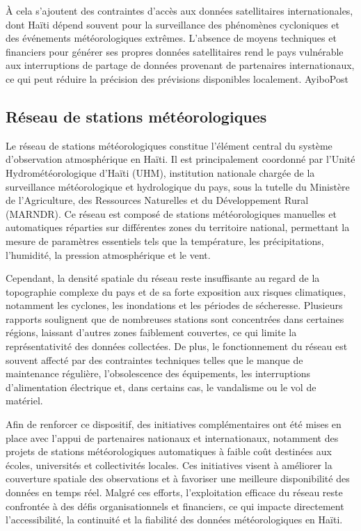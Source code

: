 À cela s’ajoutent des contraintes d’accès aux données satellitaires internationales, dont Haïti dépend souvent pour la surveillance des phénomènes cycloniques et des événements météorologiques extrêmes. L’absence de moyens techniques et financiers pour générer ses propres données satellitaires rend le pays vulnérable aux interruptions de partage de données provenant de partenaires internationaux, ce qui peut réduire la précision des prévisions disponibles localement. 
AyiboPost

\clearpage
\subsection{Réseau de stations météorologiques}
Le réseau de stations météorologiques constitue l’élément central du système d’observation atmosphérique en Haïti. Il est principalement coordonné par l’Unité Hydrométéorologique d’Haïti (UHM), institution nationale chargée de la surveillance météorologique et hydrologique du pays, sous la tutelle du Ministère de l’Agriculture, des Ressources Naturelles et du Développement Rural (MARNDR). Ce réseau est composé de stations météorologiques manuelles et automatiques réparties sur différentes zones du territoire national, permettant la mesure de paramètres essentiels tels que la température, les précipitations, l’humidité, la pression atmosphérique et le vent.

Cependant, la densité spatiale du réseau reste insuffisante au regard de la topographie complexe du pays et de sa forte exposition aux risques climatiques, notamment les cyclones, les inondations et les périodes de sécheresse. Plusieurs rapports soulignent que de nombreuses stations sont concentrées dans certaines régions, laissant d’autres zones faiblement couvertes, ce qui limite la représentativité des données collectées. De plus, le fonctionnement du réseau est souvent affecté par des contraintes techniques telles que le manque de maintenance régulière, l’obsolescence des équipements, les interruptions d’alimentation électrique et, dans certains cas, le vandalisme ou le vol de matériel.

Afin de renforcer ce dispositif, des initiatives complémentaires ont été mises en place avec l’appui de partenaires nationaux et internationaux, notamment des projets de stations météorologiques automatiques à faible coût destinées aux écoles, universités et collectivités locales. Ces initiatives visent à améliorer la couverture spatiale des observations et à favoriser une meilleure disponibilité des données en temps réel. Malgré ces efforts, l’exploitation efficace du réseau reste confrontée à des défis organisationnels et financiers, ce qui impacte directement l’accessibilité, la continuité et la fiabilité des données météorologiques en Haïti.

